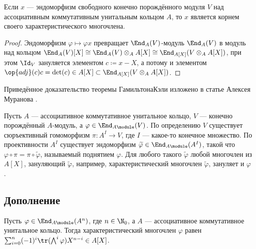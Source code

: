 \documentclass[
	extrafontsizes,
	11pt,
	hyphens,
]{memoir}
\begin{document}
\begin{theorem}
\label{thm:Cayley-Hamilton}
Если \(x\) --- эндоморфизм свободного конечно порождённого модуля \(V\) над ассоциативным коммутативным унитальным кольцом \(A\), то \(x\) является корнем своего характеристического многочлена.
\end{theorem}

\begin{proof}%
Эндоморфизм \(\varphi \mapsto \varphi x\) превращает \(\End_A(V)\)-модуль \(\End_A(V)\) в модуль над кольцом \(\End_A(V)[X] \cong \End_A(V) \otimes_A A[X] \cong \End_{A[X]}(V \otimes_A A[X])\),
при этом \(\Id_V\) зануляется элементом \(c \coloneqq x - X\), а потому и элементом \(\op{adj}(c) c = \det(c) \in A[X] \subset \End_{A[X]}(V \otimes_A A[X])\).
\end{proof}

\begin{remark}
Приведённое доказательство теоремы Гамильтона\namedash{}Кэли изложено в статье Алексея Муранова \cite{Muranov_2022}.
\end{remark}

\begin{observation}
Пусть \(A\) --- ассоциативное коммутативное унитальное кольцо, \(V\) --- конечно порождённый \(A\)-модуль, а \(\varphi \in \End_{A\module}(V)\).
По определению \(V\) существует сюръективный гомоморфизм \(\pi : A^I \to V\), где \(I\) --- какое-то конечное множество.
По проективности \(A^I\)
существует эндоморфизм \(\widetilde{\varphi} \in \End_{A\module}(A^I)\), такой что \(\varphi \circ \pi = \pi \circ \widetilde{\varphi}\),
называемый поднятием \(\varphi\).
Для любого такого \(\widetilde{\varphi}\) любой многочлен из \(A[X]\), зануляющий \(\widetilde{\varphi}\), например, характеристический многочлен \(\widetilde{\varphi}\), зануляет и \(\varphi\).
\end{observation}

\subsection{Дополнение}

\begin{theorem} 
Пусть \(\varphi \in \End_{A\module}(A^n)\), где \(n \in \N_0\), а \(A\) --- ассоциативное коммутативное унитальное кольцо.
Тогда характеристический многочлен \(\varphi\) равен \(\sum_{i=0}^n (-1)^i \tr(\bigwedge^i \varphi) X^{n-i} \in A[X]\).
\end{theorem}
\end{document}
